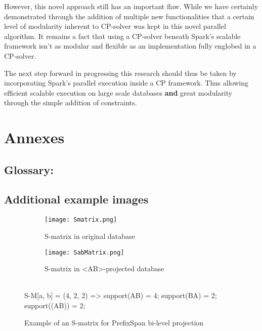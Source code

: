 \documentclass{eplmastersthesis}
\begin{document}
However, this novel approach still has an important flaw. While we have certainly demonstrated through the addition of multiple new functionalities that a certain level of modularity inherent to CP-solver was kept in this novel parallel algorithm. It remains a fact that using a CP-solver beneath Spark's scalable framework isn't as modular and flexible as an implementation fully englobed in a CP-solver.

The next step forward in progressing this research should thus be taken by incorporating Spark's parallel execution inside a CP framework. Thus allowing efficient scalable execution on large scale databases \textbf{and} great modularity through the simple addition of constraints.

\clearpage
\nocite{*}



\clearpage
\section{Annexes}

\subsection{Glossary:}

\vspace*{-1.8cm}
\glsaddall
\printglossary[title=,type=\acronymtype]

\subsection{Additional example images}

\begin{figure*}[h]
  \centering
  \begin{subfigure}[t]{0.5\textwidth}
  	\centering
    \texttt{[image: Smatrix.png]}
    \caption{S-matrix in original database}
  \end{subfigure}
  \begin{subfigure}[t]{0.49\textwidth}
  	\centering
    \texttt{[image: SabMatrix.png]}
    \caption{S-matrix in <AB>-projected database}
  \end{subfigure}
  \vspace{5px} \\
  S-M[a, b] = (4, 2, 2) => support(AB) = 4; support(BA) = 2; support((AB)) = 2;
  \caption{Example of an S-matrix for PrefixSpan bi-level projection}
  \label{fig:smatrix}
\end{figure*}
\end{document}
